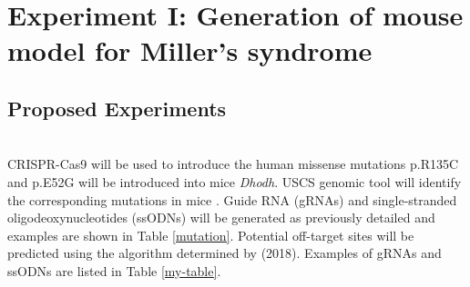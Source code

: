 \documentclass[12pt]{article}
\begin{document}
\section{Experiment I: Generation of mouse model for  Miller's syndrome}

\subsection{Proposed Experiments}
~\\ CRISPR-Cas9 will be used to introduce the human missense mutations p.R135C and p.E52G will be introduced into mice \textit{Dhodh}. USCS genomic tool will identify the corresponding mutations in mice \citep{kuhn2012ucsc}. Guide RNA (gRNAs) and single-stranded oligodeoxynucleotides (ssODNs) will be generated as previously detailed \citep{inui2014rapid} and examples are shown in Table \ref{mutation}. Potential off-target sites will be predicted using the algorithm determined by  \cite{Zheng} (2018). Examples of gRNAs and ssODNs are listed in Table \ref{my-table}.
\end{document}
